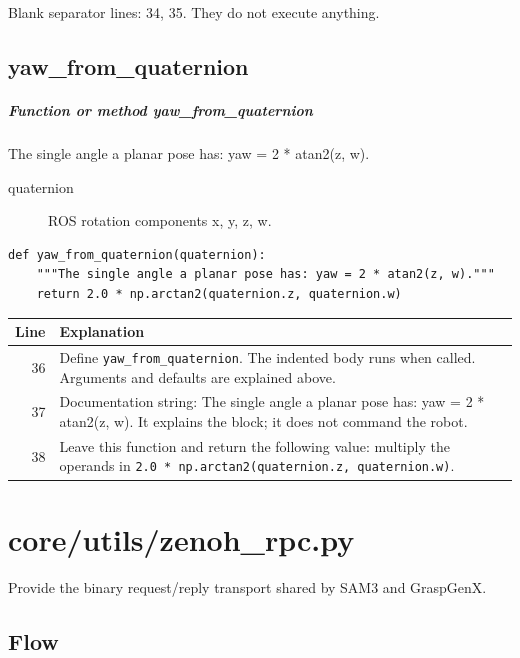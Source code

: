 \documentclass[11pt,a4paper]{book}
\begin{document}
Blank separator lines: 34, 35. They do not execute anything.

\section{yaw\_from\_quaternion}

\paragraph{Function or method yaw\_from\_quaternion}
The single angle a planar pose has: yaw = 2 * atan2(z, w).

\begin{description}
\item[quaternion] ROS rotation components x, y, z, w.
\end{description}

\begin{lstlisting}[firstnumber=36]
def yaw_from_quaternion(quaternion):
    """The single angle a planar pose has: yaw = 2 * atan2(z, w)."""
    return 2.0 * np.arctan2(quaternion.z, quaternion.w)
\end{lstlisting}

\begin{longtable}{r p{}}

\textbf{Line} & \textbf{Explanation} \\ \hline \endhead

36 & Define \texttt{yaw\_from\_quaternion}. The indented body runs when called. Arguments and defaults are explained above. \\

37 & Documentation string: The single angle a planar pose has: yaw = 2 * atan2(z, w). It explains the block; it does not command the robot. \\

38 & Leave this function and return the following value: multiply the operands in \texttt{2.0 * np.arctan2(quaternion.z, quaternion.w)}. \\

\end{longtable}

\chapter{core/utils/zenoh\_rpc.py}

Provide the binary request/reply transport shared by SAM3 and GraspGenX.

\section*{Flow}
\end{document}
